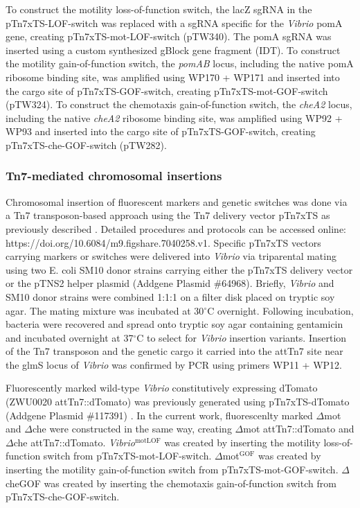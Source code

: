 {{{{{{{To construct the motility loss-of-function switch, the lacZ sgRNA in the pTn7xTS-LOF-switch was replaced with a sgRNA specific for the \textit{Vibrio} pomA gene, creating pTn7xTS-mot-LOF-switch (pTW340). The pomA sgRNA was inserted using a custom synthesized gBlock gene fragment (IDT). To construct the motility gain-of-function switch, the \textit{pomAB} locus, including the native pomA ribosome binding site, was amplified using WP170 + WP171 and inserted into the cargo site of pTn7xTS-GOF-switch, creating pTn7xTS-mot-GOF-switch (pTW324). To construct the chemotaxis gain-of-function switch, the \textit{cheA2} locus, including the native \textit{cheA2} ribosome binding site, was amplified using WP92 + WP93 and inserted into the cargo site of pTn7xTS-GOF-switch, creating pTn7xTS-che-GOF-switch (pTW282).

\subsubsection{Tn7-mediated chromosomal insertions}
Chromosomal insertion of fluorescent markers and genetic switches was done via a Tn7 transposon-based approach using the Tn7 delivery vector pTn7xTS as previously described \cite{wiles_modernized_2018}. Detailed procedures and protocols can be accessed online: https://doi.org/10.6084/m9.figshare.7040258.v1. Specific pTn7xTS vectors carrying markers or switches were delivered into \textit{Vibrio} via triparental mating using two E. coli SM10 donor strains carrying either the pTn7xTS delivery vector or the pTNS2 helper plasmid (Addgene Plasmid \#64968). Briefly, \textit{Vibrio} and SM10 donor strains were combined 1:1:1 on a filter disk placed on tryptic soy agar. The mating mixture was incubated at 30$^\circ$C overnight. Following incubation, bacteria were recovered and spread onto tryptic soy agar containing gentamicin and incubated overnight at 37$^\circ$C to select for \textit{Vibrio} insertion variants. Insertion of the Tn7 transposon and the genetic cargo it carried into the attTn7 site near the glmS locus of \textit{Vibrio} was confirmed by PCR using primers WP11 + WP12.

Fluorescently marked wild-type \textit{Vibrio} constitutively expressing dTomato (ZWU0020 attTn7::dTomato) was previously generated using pTn7xTS-dTomato (Addgene Plasmid \#117391) \cite{wiles_modernized_2018}. In the current work, fluorescenlty marked $\Delta$mot and $\Delta$che were constructed in the same way, creating $\Delta$mot attTn7::dTomato  and $\Delta$che attTn7::dTomato. \textit{Vibrio}$^{\text{motLOF}}$ was created by inserting the motility loss-of-function switch from pTn7xTS-mot-LOF-switch. $\Delta$mot$^{\text{GOF}}$ was created by inserting the motility gain-of-function switch from pTn7xTS-mot-GOF-switch. $\Delta$cheGOF was created by inserting the chemotaxis gain-of-function switch from pTn7xTS-che-GOF-switch.

}}}}}}}
